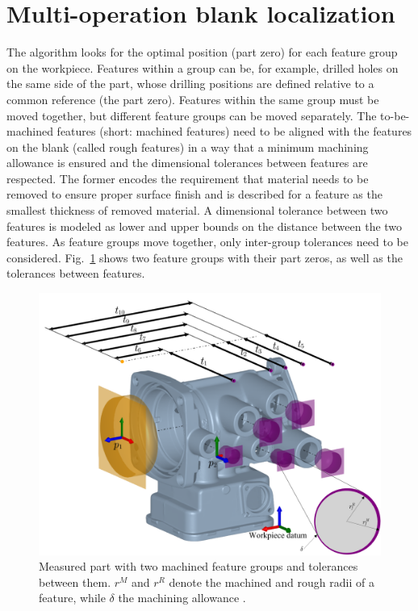 \documentclass{juliacon}
\begin{document}
\section{Multi-operation blank localization}
\label{sec:algo}

The algorithm looks for the optimal position (part zero) for each feature group on the workpiece. 
Features within a group can be, for example, drilled holes on the same side of the part, whose drilling positions are defined relative to a common reference (the part zero).
Features within the same group must be moved together, but different feature groups can be moved separately.
The to-be-machined features (short: machined features) need to be aligned with the features on the blank (called rough features) in a way that a minimum machining allowance is ensured and the dimensional tolerances between features are respected.
The former encodes the requirement that material needs to be removed to ensure proper surface finish and is described for a feature as the smallest thickness of removed material.
A dimensional tolerance between two features is modeled as lower and upper bounds on the distance between the two features.
As feature groups move together, only inter-group tolerances need to be considered.
Fig.~\ref{fig:hatfig} shows two feature groups with their part zeros, as well as the tolerances between features.

\begin{figure}[b]
	\centerline{\includegraphics[width=0.95\columnwidth]{cirp-annals-2023-figure-2.png}}
	\caption{Measured part with two machined feature groups and tolerances between them. $r^M$ and $r^R$ denote the machined and rough radii of a feature, while $\delta$ the machining allowance \cite{cserteg:2023_Annals}.}
	\label{fig:hatfig}
\end{figure}
\end{document}

